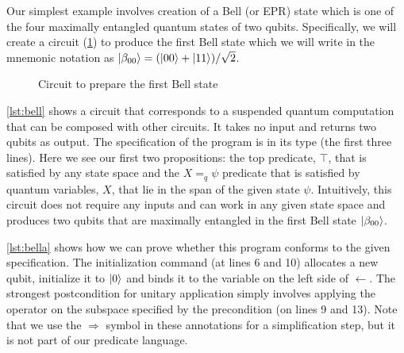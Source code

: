 \documentclass[adraft,creativecommons]{eptcs}
\theoremstyle{definition}
\theoremstyle{remark}
\begin{document}
Our simplest example involves creation of a Bell (or EPR) state which is one of the four maximally entangled quantum states of two qubits. Specifically, we will create a circuit (\cref{fig:bell00}) to produce the first Bell state which we will write in the mnemonic notation as $\ket{\beta_{00}} = (\ket{00}+\ket{11})/\sqrt{2}$.

\begin{figure}
    \centering
    \caption{Circuit to prepare the first Bell state}
    \label{fig:bell00}
\end{figure}



\cref{lst:bell} shows a circuit that corresponds to a suspended quantum computation that can be composed with other circuits. It takes no input and returns two qubits as output. The specification of the program is in its type (the first three lines). Here we see our first two propositions: the top predicate, $\top$, that is satisfied by any state space and the $X =_q \psi$ predicate that is satisfied by quantum variables, $X$, that lie in the span of the given state $\psi$. Intuitively, this circuit does not require any inputs and can work in any given state space and produces two qubits that are maximally entangled in the first Bell state $\ket{\beta_{00}}$.

\cref{lst:bella} shows how we can prove whether this program conforms to the given specification. The initialization command (at lines 6 and 10) allocates a new qubit, initialize it to $\ket{0}$ and binds it to the variable on the left side of $\leftarrow$. The strongest postcondition for unitary application simply involves applying the operator on the subspace specified by the precondition (on lines 9 and 13). Note that we use the $\Rightarrow$ symbol in these annotations for a simplification step, but it is not part of our predicate language.


\end{document}
